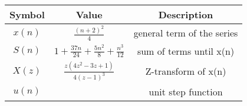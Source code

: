 \begin{tabular}{|c|c|c|}
    \hline
    	\textbf{Symbol} & \textbf{Value} & \textbf{Description} \\
    \hline
	  $x(n)$ & $\frac{(n+2)^2}{4}$ & general term of the series \\
    \hline
    	  $S(n)$ & $1 + \frac{37n}{24} + \frac{5n^2}{8} + \frac{n^3}{12}$ & sum of terms until x(n) \\
    \hline
	  $X(z)$ & $\frac{z(4z^2 - 3z + 1)}{4(z - 1)^3}$ & Z-transform of x(n) \\
    \hline 
	  $u(n)$ & & unit step function \\
    \hline
  \end{tabular}
